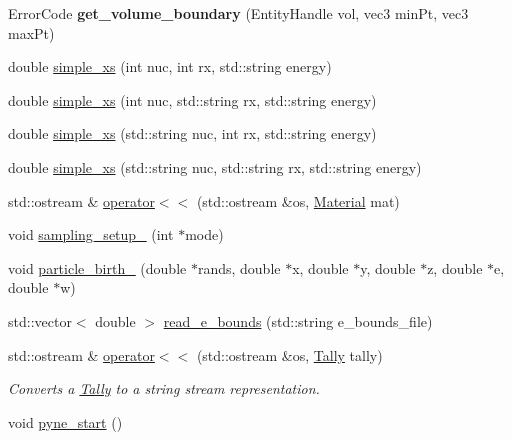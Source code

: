 \begin{DoxyCompactItemize}
\item 
\hypertarget{namespacepyne_a41c879e6c635870307ab2a999e588429}{Error\-Code {\bfseries get\-\_\-volume\-\_\-boundary} (Entity\-Handle vol, vec3 min\-Pt, vec3 max\-Pt)}\label{namespacepyne_a41c879e6c635870307ab2a999e588429}

\item 
double \hyperlink{namespacepyne_abde9d0cbfe70fd1a75a7cb2d1f59e1f1}{simple\-\_\-xs} (int nuc, int rx, std\-::string energy)
\item 
double \hyperlink{namespacepyne_ab10ec6870a2330af652b07b4dc6dcb27}{simple\-\_\-xs} (int nuc, std\-::string rx, std\-::string energy)
\item 
double \hyperlink{namespacepyne_a5175275a09e97886dcf15a082a719812}{simple\-\_\-xs} (std\-::string nuc, int rx, std\-::string energy)
\item 
double \hyperlink{namespacepyne_ac9f173d7792a84eb558dc7396c7d4d56}{simple\-\_\-xs} (std\-::string nuc, std\-::string rx, std\-::string energy)
\item 
std\-::ostream \& \hyperlink{namespacepyne_a1241699bbd3224bb066190b7778dbd82}{operator$<$$<$} (std\-::ostream \&os, \hyperlink{classpyne_1_1_material}{Material} mat)
\item 
void \hyperlink{namespacepyne_a4b568e0d7793942733d5403116ddc00f}{sampling\-\_\-setup\-\_\-} (int $\ast$mode)
\item 
void \hyperlink{namespacepyne_ab6600e28064496661683a9c6ac4d5ec5}{particle\-\_\-birth\-\_\-} (double $\ast$rands, double $\ast$x, double $\ast$y, double $\ast$z, double $\ast$e, double $\ast$w)
\item 
std\-::vector$<$ double $>$ \hyperlink{namespacepyne_ab3863857f230598b1f05504671c2bafc}{read\-\_\-e\-\_\-bounds} (std\-::string e\-\_\-bounds\-\_\-file)
\item 
\hypertarget{namespacepyne_a6cd92dc1f5fb7e90e3d65c41b0b41f3c}{std\-::ostream \& \hyperlink{namespacepyne_a6cd92dc1f5fb7e90e3d65c41b0b41f3c}{operator$<$$<$} (std\-::ostream \&os, \hyperlink{classpyne_1_1_tally}{Tally} tally)}\label{namespacepyne_a6cd92dc1f5fb7e90e3d65c41b0b41f3c}

\begin{DoxyCompactList}\small\item\em Converts a \hyperlink{classpyne_1_1_tally}{Tally} to a string stream representation. \end{DoxyCompactList}\item 
\hypertarget{namespacepyne_a3b5ffed8eb26b84ae2a5af20aa205623}{void \hyperlink{namespacepyne_a3b5ffed8eb26b84ae2a5af20aa205623}{pyne\-\_\-start} ()}\label{namespacepyne_a3b5ffed8eb26b84ae2a5af20aa205623}


\end{DoxyCompactItemize}
